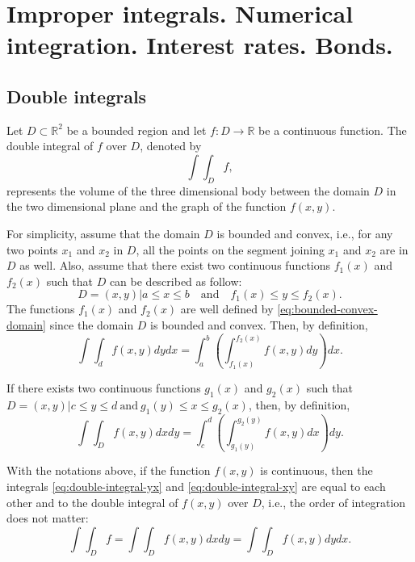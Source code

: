 \chapter{Improper integrals. Numerical integration. Interest rates. Bonds.}

\section{Double integrals}
Let $ D \subset \mathbb{R}^2 $ be a bounded region and let
    $ f : D \rightarrow \mathbb{R} $ be a continuous function.
The double integral of $ f $ over $ D $, denoted by
\begin{equation*}
    \int \int_D f,
\end{equation*}
represents the volume of the three dimensional body between the domain $ D $ in
    the two dimensional plane and the graph of the function $ f(x, y) $.

For simplicity, assume that the domain $ D $ is bounded and convex, i.e., for
    any two points $ x_1 $ and $ x_2 $ in $ D $, all the points on the segment
    joining $ x_1 $ and $ x_2 $ are in $ D $ as well.
Also, assume that there exist two continuous functions $ f_1(x) $ and $ f_2(x) $
    such that $ D $ can be described as follow:
\begin{equation}
    D = {(x, y) | a \leq x \leq b \quad \text{and} \quad f_1(x) \leq y \leq
        f_2(x)}.
    \label{eq:bounded-convex-domain}
\end{equation}
The functions $ f_1(x) $ and $ f_2(x) $ are well defined by
    \eqref{eq:bounded-convex-domain} since the domain $ D $ is bounded and
    convex.
Then, by definition,
\begin{equation}
    \int \int_d f(x, y) dy dx = \int_{a}^{b} \left( \int_{f_1(x)}^{f_2(x)}
        f(x, y) dy \right) dx.
    \label{eq:double-integral-yx}
\end{equation}

If there exists two continuous functions $ g_1(x) $ and $ g_2(x) $ such that
    $ D = {(x, y) | c \leq y \leq d\ \text{and}\ g_1(y) \leq x \leq g_2(x)} $,
    then, by definition,
\begin{equation}
    \int \int_D f(x, y) dx dy = \int_{c}^{d} \left( \int_{g_1(y)}^{g_2(y)}
        f(x, y) dx \right) dy.
    \label{eq:double-integral-xy}
\end{equation}

\begin{theorem}
    With the notations above, if the function $ f(x, y) $ is continuous, then
        the integrals \eqref{eq:double-integral-yx} and
        \eqref{eq:double-integral-xy} are equal to each other and to the double
        integral of $ f(x, y) $ over $ D $, i.e., the order of integration does
        not matter:
    \begin{equation}
        \int \int_D f = \int \int_D f(x, y) dx dy = \int \int_D f(x, y) dy dx.
        \label{eq:theorem:fubini}
    \end{equation}
\end{theorem}


